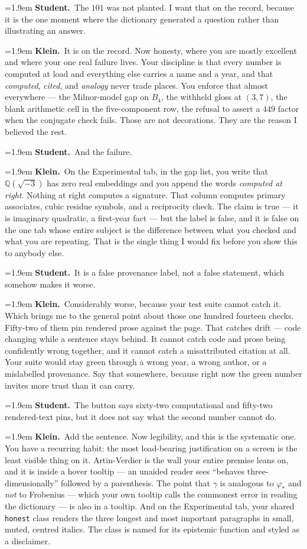 \documentclass[11pt]{article}
\newcommand{\Stu}[1]{\par\smallskip\noindent\hangindent=1.9em\hangafter=1%
  \textcolor{stucol}{\textbf{Student.}}~#1\par}
\newcommand{\Kle}[1]{\par\smallskip\noindent\hangindent=1.9em\hangafter=1%
  \textcolor{klecol}{\textbf{Klein.}}~#1\par}
\begin{document}
\Stu{The $101$ was not planted. I want that on the record, because it is the one moment where the dictionary generated a question rather than illustrating an answer.}

\Kle{It is on the record. Now honesty, where you are mostly excellent and where your one real failure lives. Your discipline is that every number is computed at load and everything else carries a name and a year, and that \emph{computed}, \emph{cited}, and \emph{analogy} never trade places. You enforce that almost everywhere --- the Milnor-model gap on $B_4$, the withheld gloss at $(3,7)$, the blank arithmetic cell in the five-component row, the refusal to assert a $449$ factor when the conjugate check fails. Those are not decorations. They are the reason I believed the rest.}

\Stu{And the failure.}

\Kle{On the Experimental tab, in the gap list, you write that $\mathbb{Q}(\sqrt{-3})$ has zero real embeddings and you append the words \emph{computed at right}. Nothing at right computes a signature. That column computes primary associates, cubic residue symbols, and a reciprocity check. The claim is true --- it is imaginary quadratic, a first-year fact --- but the label is false, and it is false on the one tab whose entire subject is the difference between what you checked and what you are repeating. That is the single thing I would fix before you show this to anybody else.}

\Stu{It is a false provenance label, not a false statement, which somehow makes it worse.}

\Kle{Considerably worse, because your test suite cannot catch it. Which brings me to the general point about those one hundred fourteen checks. Fifty-two of them pin rendered prose against the page. That catches drift --- code changing while a sentence stays behind. It cannot catch code and prose being confidently wrong together, and it cannot catch a misattributed citation at all. Your suite would stay green through a wrong year, a wrong author, or a mislabelled provenance. Say that somewhere, because right now the green number invites more trust than it can carry.}

\Stu{The button says sixty-two computational and fifty-two rendered-text pins, but it does not say what the second number cannot do.}

\Kle{Add the sentence. Now legibility, and this is the systematic one. You have a recurring habit: the most load-bearing justification on a screen is the least visible thing on it. Artin-Verdier is the wall your entire premise leans on, and it is inside a hover tooltip --- an unaided reader sees ``behaves three-dimensionally'' followed by a parenthesis. The point that $\gamma$ is analogous to $\varphi_*$ and \emph{not} to Frobenius --- which your own tooltip calls the commonest error in reading the dictionary --- is also in a tooltip. And on the Experimental tab, your shared \texttt{honest} class renders the three longest and most important paragraphs in small, muted, centred italics. The class is named for its epistemic function and styled as a disclaimer.}
\end{document}
